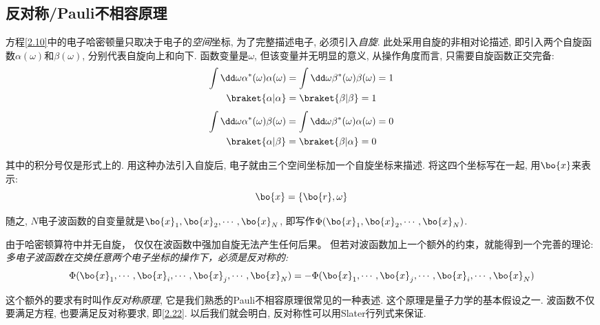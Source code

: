 \subsection{反对称/Pauli不相容原理}
\label{sec2.1.3}
方程\autoref{2.10}中的电子哈密顿量只取决于电子的\emph{空间}坐标, 
为了完整描述电子, 
必须引入\emph{自旋}. 
此处采用自旋的非相对论描述, 
即引入两个自旋函数$\alpha(\omega)$和$\beta(\omega)$, 
分别代表自旋向上和向下. 
函数变量是$\omega$, 
但该变量并无明显的意义, 
从操作角度而言, 
只需要自旋函数正交完备:
\begin{subequations}
	\begin{align}
\int\dd\omega\alpha^*(\omega)\alpha(\omega) &= \int\dd\omega\beta^*(\omega)\beta(\omega) = 1\\
\braket{\alpha|\alpha} &= \braket{\beta|\beta} = 1
	\end{align}
\end{subequations}
\begin{subequations}
	\begin{align}
	\int\dd\omega\alpha^*(\omega)\beta(\omega)&=\int\dd\omega\beta^*(\omega)\alpha(\omega)=0\\
	\braket{\alpha|\beta}&=\braket{\beta|\alpha}=0
	\end{align}
\end{subequations}
\label{2.20}

其中的积分号仅是形式上的. 
用这种办法引入自旋后, 
电子就由三个空间坐标加一个自旋坐标来描述. 
将这四个坐标写在一起,
用$\bo{x}$来表示:
 \begin{equation}
 \label{2.21}
 \bo{x}=\{\bo{r},\omega\}
 \end{equation}

随之, $N$电子波函数的自变量就是$ \bo{x}_1,\bo{x}_2,\cdots ,\bo{x}_N $, 即写作$\Phi(\bo{x}_1,\bo{x}_2,\cdots ,\bo{x}_N)$.

由于哈密顿算符中并无自旋，
仅仅在波函数中强加自旋无法产生任何后果。
但若对波函数加上一个额外的约束，就能得到一个完善的理论: 
\emph{
	多电子波函数在交换任意两个电子坐标的操作下，必须是反对称的:
}
\begin{equation}
\label{2.22}
\Phi(\bo{x}_1,\cdots,\bo{x}_i,\cdots,\bo{x}_j,\cdots ,\bo{x}_N)=-\Phi(\bo{x}_1,\cdots,\bo{x}_j,\cdots,\bo{x}_i,\cdots ,\bo{x}_N)
\end{equation}

这个额外的要求有时叫作\emph{反对称原理}, 
它是我们熟悉的Pauli不相容原理很常见的一种表述. 
这个原理是量子力学的基本假设之一. 
波函数不仅要满足\sch 方程, 
也要满足反对称要求, 即\autoref{2.22}. 
以后我们就会明白, 反对称性可以用Slater行列式来保证.
 
